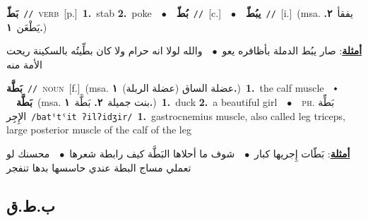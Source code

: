 \documentclass[10pt,a4paper,twoside]{article} %
\begin{document}
\begin{multicols}{2}
{\setlength\topsep{0pt}\textbf{\foreignlanguage{arabic}{بَطّ}}\ {\color{gray}\texttt{//}\color{black}}\ \textsc{verb}\ [p.]\ \textbf{1.}~stab  \textbf{2.}~poke\ \ $\bullet$\ \ \setlength\topsep{0pt}\textbf{\foreignlanguage{arabic}{بُطّ}}\ {\color{gray}\texttt{//}\color{black}}\ [c.]\ \ $\bullet$\ \ \setlength\topsep{0pt}\textbf{\foreignlanguage{arabic}{يبُطّ}}\ {\color{gray}\texttt{//}\color{black}}\ [i.]\ \color{gray}(msa. \foreignlanguage{arabic}{يفقأ}~\foreignlanguage{arabic}{\textbf{٢.}}  \foreignlanguage{arabic}{يَطْعَن}~\foreignlanguage{arabic}{\textbf{١.}})\color{black}\  \begin{flushright}\color{gray}\foreignlanguage{arabic}{\textbf{\underline{\foreignlanguage{arabic}{أمثلة}}}: صار يبُط الدملة بأظافره يعو\ $\bullet$\ \  والله لولا انه حرام ولا كان بطِّيتُه بالسكينة ريحت الأمة منه}\end{flushright}\color{black}} \vspace{2mm}

{\setlength\topsep{0pt}\textbf{\foreignlanguage{arabic}{بَطَّة}}\ {\color{gray}\texttt{//}\color{black}}\ \textsc{noun}\ [f.]\ \color{gray}(msa. \foreignlanguage{arabic}{عضلة الساق (عضلة الربلة)}~\foreignlanguage{arabic}{\textbf{١.}})\color{black}\ \textbf{1.}~the calf muscle\ \ $\smblkdiamond$\ \ \setlength\topsep{0pt}\textbf{\foreignlanguage{arabic}{بَطَّة}}\ \color{gray}(msa. \foreignlanguage{arabic}{بنت جميلة}~\foreignlanguage{arabic}{\textbf{٢.}}  \foreignlanguage{arabic}{بَطَّة}~\foreignlanguage{arabic}{\textbf{١.}})\color{black}\ \textbf{1.}~duck  \textbf{2.}~a beautiful girl\ \ $\bullet$\ \ \textsc{ph.} \color{gray} \foreignlanguage{arabic}{بَطِّة الإِجِر}\color{black}\ {\color{gray}\texttt{/{\sffamily batˤtˤit ʔilʔidʒir}/}\color{black}}\ \textbf{1.}~gastrocnemius muscle, also called leg triceps, large posterior muscle of the calf of the leg\  \begin{flushright}\color{gray}\foreignlanguage{arabic}{\textbf{\underline{\foreignlanguage{arabic}{أمثلة}}}: بَطّات إِجريها كبار\ $\bullet$\ \  شوف ما أحلاها البَطَّة كيف رابطة شعرها\ $\bullet$\ \  محسنك لو تعملي مساج البطة عندي حاسسها بدها تنفجر}\end{flushright}\color{black}} \vspace{2mm}

\vspace{-3mm}
\subsection*{\color{blue}\foreignlanguage{arabic}{ب.ط.ق}\color{blue}{}} 


\end{multicols}
\end{document}
